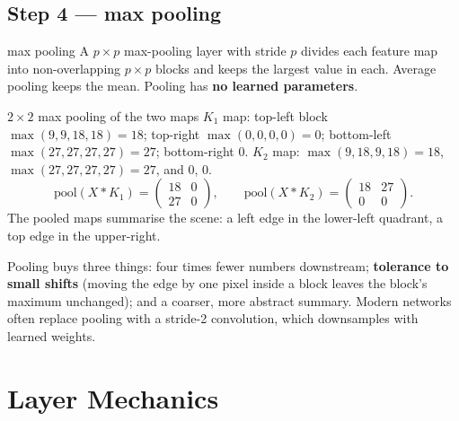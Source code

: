 \documentclass[11pt]{article}
\begin{document}
\subsection{Step 4 --- max pooling}
\begin{definition}{max pooling}
A $p\times p$ max-pooling layer with stride $p$ divides each feature map into non-overlapping $p\times p$ blocks and keeps the largest value in each. Average pooling keeps the mean. Pooling has \textbf{no learned parameters}.
\end{definition}
\begin{example}{$2\times2$ max pooling of the two maps}
$K_1$ map: top-left block $\max(9,9,18,18)=18$; top-right $\max(0,0,0,0)=0$; bottom-left $\max(27,27,27,27)=27$; bottom-right 0. $K_2$ map: $\max(9,18,9,18)=18$, $\max(27,27,27,27)=27$, and 0, 0.
\[\text{pool}(X*K_1)=\begin{pmatrix}18&0\\27&0\end{pmatrix},\qquad\text{pool}(X*K_2)=\begin{pmatrix}18&27\\0&0\end{pmatrix}.\]
The pooled maps summarise the scene: a left edge in the lower-left quadrant, a top edge in the upper-right.
\end{example}
Pooling buys three things: four times fewer numbers downstream; \textbf{tolerance to small shifts} (moving the edge by one pixel inside a block leaves the block's maximum unchanged); and a coarser, more abstract summary. Modern networks often replace pooling with a stride-2 convolution, which downsamples with learned weights.

\section{Layer Mechanics}
\end{document}
